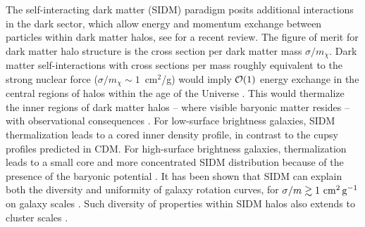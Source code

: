 The self-interacting dark matter (SIDM) paradigm \citep{1992ApJ...398...43C,Spergel:1999mh,Dave:2000ar,Firmani:2000ce} posits additional interactions in the dark sector, which allow energy and momentum exchange between particles within dark matter halos, see \cite{Tulin:2017ara} for a recent review. The figure of merit for dark matter halo structure is the cross section per dark matter mass $\sigma/m_\chi$.
Dark matter self-interactions with cross sections per mass roughly equivalent to the strong nuclear force ($\sigma/m_\chi \sim 1$~cm$^2$/g) would imply ${\cal O}(1)$ energy exchange in the central regions of halos within the age of the Universe \citep{2012MNRAS.423.3740V,2013MNRAS.431L..20Z,2013MNRAS.430..105P,Rocha:2012jg}. This  would thermalize the inner regions of dark matter halos -- where visible baryonic matter resides -- with observational consequences \citep[see \eg][]{Kaplinghat:2013xca}. For low-surface brightness galaxies, SIDM thermalization leads to a cored inner density profile, in contrast to the cupsy profiles predicted in CDM. For high-surface brightness galaxies, thermalization leads to a small core and more concentrated SIDM distribution because of the presence of the baryonic potential \citep{Kaplinghat:2015aga}. It has been shown that SIDM can explain both the diversity and uniformity of galaxy rotation curves, for $\sigma/m\gtrsim 1\mathrm{\,\mathrm{\,cm}^2\mathrm{\,g}^{-1}}$ on galaxy scales \citep{Kamada:2016euw,Creasey:2016jaq,Ren:2018jpt}. Such diversity of properties within SIDM halos also extends to cluster scales \citep{Robertson:2017mgj}.

